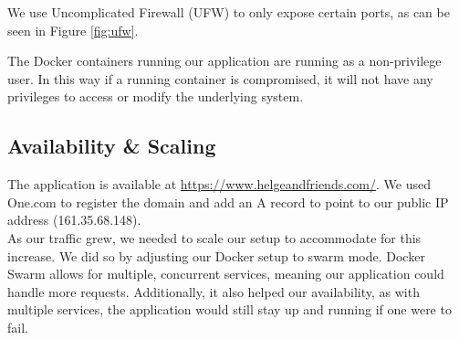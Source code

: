 \noindent We use Uncomplicated Firewall (UFW) to only expose certain ports, as can be seen in Figure \ref{fig:ufw}. \newline

\noindent The Docker containers running our application are running as a non-privilege user. In this way if a running container is compromised, it will not have any privileges to access or modify the underlying system.




\subsection{Availability \& Scaling}
The application is available at \url{https://www.helgeandfriends.com/}. We used One.com to register the domain and add an A record to point to our public IP address (161.35.68.148). \\ %

\noindent As our traffic grew, we needed to scale our setup to accommodate for this increase. We did so by adjusting our Docker setup to swarm mode. Docker Swarm allows for multiple, concurrent services, meaning our application could handle more requests. Additionally, it also helped our availability, as with multiple services, the application would still stay up and running if one were to fail. 